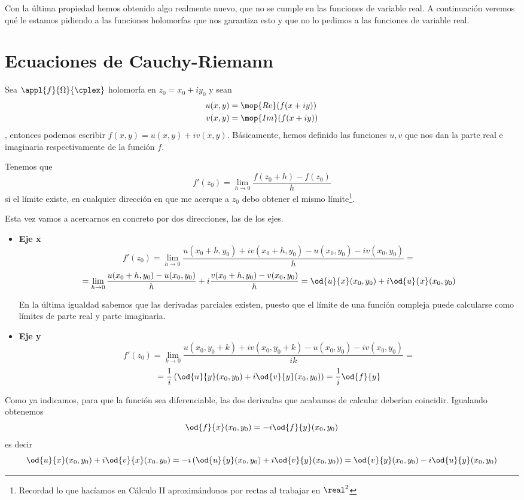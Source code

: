 \documentclass{apuntes}
\begin{document}
Con la última propiedad hemos obtenido algo realmente nuevo, que no se cumple en las funciones de variable real. A continuación veremos qué le estamos pidiendo a las funciones holomorfas que nos garantiza esto y que no lo pedimos a las funciones de variable real.


\section{Ecuaciones de Cauchy-Riemann}
Sea $\appl{f}{\Omega}{\cplex}$ holomorfa en $z_0=x_0+iy_0$ y sean
\begin{align*}
u(x,y) &= \mop{Re}(f(x+iy)) \\
v(x,y) &= \mop{Im}(f(x+iy))
\end{align*}, entonces podemos escribir $f(x,y)=u(x,y)+iv(x,y)$. Básicamente, hemos definido las funciones $u,v$ que nos dan la parte real e imaginaria respectivamente de la función $f$.

Tenemos que
\[f'(z_0)=\lim_{h \to 0} \frac{f(z_0+h)-f(z_0)}{h}\]
si el límite existe, en cualquier dirección en que me acerque a $z_0$ debo obtener el mismo límite\footnote{Recordad lo que hacíamos en Cálculo II aproximándonos por rectas al trabajar en $\real^2$}.

Esta vez vamos a acercarnos en concreto por dos direcciones, las de los ejes.
\begin{itemize}
\item \textbf{Eje x}
\[f'(z_0)=\lim_{h \to 0} \frac{u(x_0+h,y_0)+iv(x_0+h,y_0)-u(x_0, y_0)-iv(x_0,y_0)}{h}=\]
\[= \lim_{h \to 0}\frac{u(x_0+h,y_0)-u(x_0, y_0)}{h}+i\frac{v(x_0+h,y_0)-v(x_0,y_0)}{h}=\od{u}{x}(x_0,y_0)+i\od{u}{x}(x_0,y_0)\]

En la última igualdad sabemos que las derivadas parciales existen, puesto que el límite de una función compleja puede calcularse como límites de parte real y parte imaginaria.

\item \textbf{Eje y}
\[f'(z_0)=\lim_{k \to 0} \frac{u(x_0,y_0+k)+iv(x_0,y_0+k)-u(x_0, y_0)-iv(x_0,y_0)}{ik}=\]
\[=\frac{1}{i}\left(\od{u}{y}(x_0,y_0)+i \od{v}{y}(x_0, y_0)\right)=\frac{1}{i}\od{f}{y}\]
\end{itemize}

Como ya indicamos, para que la función sea diferenciable, las dos derivadas que acabamos de calcular deberían coincidir. Igualando obtenemos
\[\od{f}{x}(x_0,y_0)= -i \od{f}{y} (x_0,y_0)\]
es decir
\[\od{u}{x}(x_0,y_0)+i\od{v}{x}(x_0,y_0)=-i\left(\od{u}{y}(x_0,y_0)+i\od{v}{y}(x_0,y_0)\right)=\od{v}{y}(x_0,y_0)-i\od{u}{y}(x_0,y_0)\]
\end{document}
